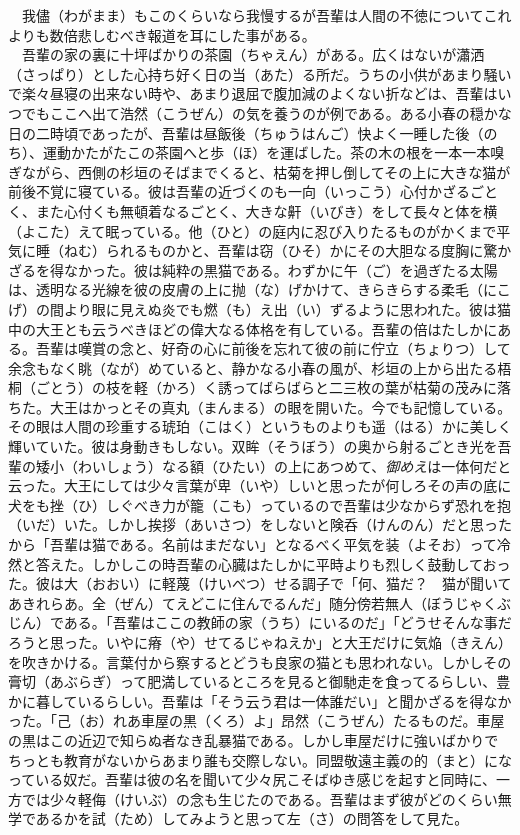 \documentclass{book}
\begin{document}
　我儘（わがまま）もこのくらいなら我慢するが吾輩は人間の不徳についてこれよりも数倍悲しむべき報道を耳にした事がある。\\
　吾輩の家の裏に十坪ばかりの茶園（ちゃえん）がある。広くはないが瀟洒（さっぱり）とした心持ち好く日の当（あた）る所だ。うちの小供があまり騒いで楽々昼寝の出来ない時や、あまり退屈で腹加減のよくない折などは、吾輩はいつでもここへ出て浩然（こうぜん）の気を養うのが例である。ある小春の穏かな日の二時頃であったが、吾輩は昼飯後（ちゅうはんご）快よく一睡した後（のち）、運動かたがたこの茶園へと歩（ほ）を運ばした。茶の木の根を一本一本嗅ぎながら、西側の杉垣のそばまでくると、枯菊を押し倒してその上に大きな猫が前後不覚に寝ている。彼は吾輩の近づくのも一向（いっこう）心付かざるごとく、また心付くも無頓着なるごとく、大きな鼾（いびき）をして長々と体を横（よこた）えて眠っている。他（ひと）の庭内に忍び入りたるものがかくまで平気に睡（ねむ）られるものかと、吾輩は窃（ひそ）かにその大胆なる度胸に驚かざるを得なかった。彼は純粋の黒猫である。わずかに午（ご）を過ぎたる太陽は、透明なる光線を彼の皮膚の上に抛（な）げかけて、きらきらする柔毛（にこげ）の間より眼に見えぬ炎でも燃（も）え出（い）ずるように思われた。彼は猫中の大王とも云うべきほどの偉大なる体格を有している。吾輩の倍はたしかにある。吾輩は嘆賞の念と、好奇の心に前後を忘れて彼の前に佇立（ちょりつ）して余念もなく眺（なが）めていると、静かなる小春の風が、杉垣の上から出たる梧桐（ごとう）の枝を軽（かろ）く誘ってばらばらと二三枚の葉が枯菊の茂みに落ちた。大王はかっとその真丸（まんまる）の眼を開いた。今でも記憶している。その眼は人間の珍重する琥珀（こはく）というものよりも遥（はる）かに美しく輝いていた。彼は身動きもしない。双眸（そうぼう）の奥から射るごとき光を吾輩の矮小（わいしょう）なる額（ひたい）の上にあつめて、\emph{御めえ}は一体何だと云った。大王にしては少々言葉が卑（いや）しいと思ったが何しろその声の底に犬をも挫（ひ）しぐべき力が籠（こも）っているので吾輩は少なからず恐れを抱（いだ）いた。しかし挨拶（あいさつ）をしないと険呑（けんのん）だと思ったから「吾輩は猫である。名前はまだない」となるべく平気を装（よそお）って冷然と答えた。しかしこの時吾輩の心臓はたしかに平時よりも烈しく鼓動しておった。彼は大（おおい）に軽蔑（けいべつ）せる調子で「何、猫だ？　猫が聞いてあきれらあ。全（ぜん）てえどこに住んでるんだ」随分傍若無人（ぼうじゃくぶじん）である。「吾輩はここの教師の家（うち）にいるのだ」「どうせそんな事だろうと思った。いやに瘠（や）せてるじゃねえか」と大王だけに気焔（きえん）を吹きかける。言葉付から察するとどうも良家の猫とも思われない。しかしその膏切（あぶらぎ）って肥満しているところを見ると御馳走を食ってるらしい、豊かに暮しているらしい。吾輩は「そう云う君は一体誰だい」と聞かざるを得なかった。「己（お）れあ車屋の黒（くろ）よ」昂然（こうぜん）たるものだ。車屋の黒はこの近辺で知らぬ者なき乱暴猫である。しかし車屋だけに強いばかりでちっとも教育がないからあまり誰も交際しない。同盟敬遠主義の的（まと）になっている奴だ。吾輩は彼の名を聞いて少々尻こそばゆき感じを起すと同時に、一方では少々軽侮（けいぶ）の念も生じたのである。吾輩はまず彼がどのくらい無学であるかを試（ため）してみようと思って左（さ）の問答をして見た。\\
\end{document}
